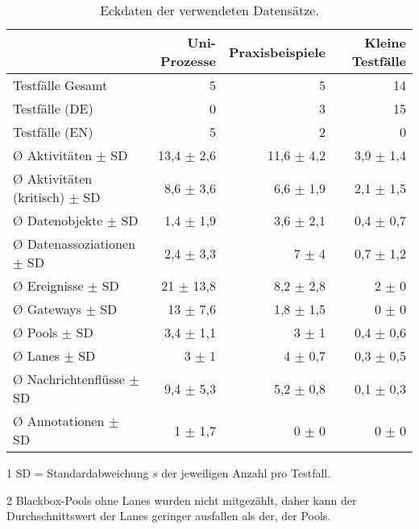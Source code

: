 \begin{table}[htbp]
    \centering
    \begin{threeparttable}
    \caption{Eckdaten der verwendeten Datensätze.}
    \label{tab:datensaetze-eckdaten}
    \begin{tabular}{l r r r}
        \toprule
        & Uni-Prozesse & Praxisbeispiele & Kleine Testfälle \\
        \midrule
        Testfälle Gesamt                  & 5  & 5 & 14 \\
        Testfälle (DE)                    & 0 & 3 & 15 \\
        Testfälle (EN)                    & 5 & 2 & 0 \\
        Ø Aktivitäten $\pm$ SD\tnote{1}   & 13,4 $\pm$ 2,6 & 11,6 $\pm$ 4,2 & 3,9 $\pm$ 1,4 \\
        Ø Aktivitäten (kritisch) $\pm$ SD & 8,6 $\pm$ 3,6 & 6,6 $\pm$ 1,9 & 2,1 $\pm$ 1,5 \\
        Ø Datenobjekte $\pm$ SD           & 1,4 $\pm$ 1,9 & 3,6 $\pm$ 2,1 & 0,4 $\pm$ 0,7 \\
        Ø Datenassoziationen $\pm$ SD     & 2,4 $\pm$ 3,3 & 7 $\pm$ 4 & 0,7 $\pm$ 1,2 \\
        Ø Ereignisse $\pm$ SD             & 21 $\pm$ 13,8 & 8,2 $\pm$ 2,8 & 2 $\pm$ 0 \\
        Ø Gateways $\pm$ SD               & 13 $\pm$ 7,6 & 1,8 $\pm$ 1,5 & 0 $\pm$ 0 \\
        Ø Pools $\pm$ SD                  & 3,4 $\pm$ 1,1 & 3 $\pm$ 1 & 0,4 $\pm$ 0,6 \\
        Ø Lanes $\pm$ SD\tnote{2}         & 3 $\pm$ 1 & 4 $\pm$ 0,7 & 0,3 $\pm$ 0,5 \\
        Ø Nachrichtenflüsse $\pm$ SD      & 9,4 $\pm$ 5,3 & 5,2 $\pm$ 0,8 & 0,1 $\pm$ 0,3 \\
        Ø Annotationen $\pm$ SD           & 1 $\pm$ 1,7 & 0 $\pm$ 0 & 0 $\pm$ 0 \\
        \bottomrule
    \end{tabular}
    \begin{tablenotes}
        \item[1] SD = Standardabweichung $s$ der jeweiligen Anzahl pro Testfall.
        \item[2] Blackbox-Pools ohne Lanes wurden nicht mitgezählt, daher kann der Durchschnittswert der Lanes geringer ausfallen als der, der Pools.
    \end{tablenotes}
    \end{threeparttable}
\end{table}